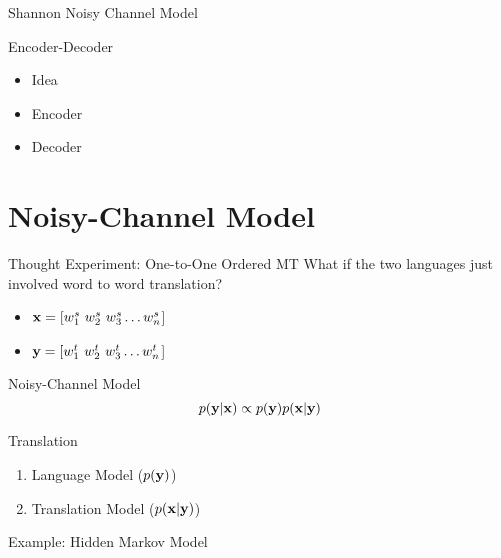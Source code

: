 \documentclass{beamer}
\begin{document}
\begin{frame}{Shannon Noisy Channel Model}
  
\end{frame}

\begin{frame}{Encoder-Decoder}
  \begin{itemize}
  \item Idea
  \item Encoder
  \item Decoder 
  \end{itemize}
\end{frame}

\section{Noisy-Channel Model}

\begin{frame}{Thought Experiment: One-to-One Ordered MT }
  What if the two languages just involved word to word 
  translation?

  \begin{itemize}
  \item $\mathbf{x}  = [ w^s_1\ w^s_2\ w^s_3\ldots w^s_n $] 
  \item $\mathbf{y} =  [w^t_1\ w^t_2\ w^t_3\ldots w^t_n $] 
  \end{itemize}
\end{frame}


\begin{frame}{Noisy-Channel Model}
  \[ p(\mathbf{y} | \mathbf{x}) \propto p(\mathbf{y}) p(\mathbf{x} | \mathbf{y}) \] 
\end{frame}

\begin{frame}{Translation}
  \begin{enumerate}
  \item Language Model ($p(\mathbf{y})$) 
  \item Translation Model ($p(\mathbf{x} | \mathbf{y})$) 
  \end{enumerate}
\end{frame}

\begin{frame}{Example: Hidden Markov Model}
\begin{center}  
\end{center}  
\end{frame}
\end{document}
